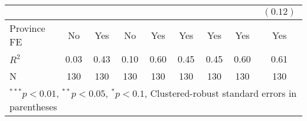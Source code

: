 \begin{tabular}{l c c c c c c c c }
                &              &          &               &               &          &          &              & $(0.12)$      \\
\hline
Province FE & No & Yes & No & Yes & Yes & Yes & Yes & Yes  \\ 
\hline
$R^2$           & 0.03         & 0.43     & 0.10          & 0.60          & 0.45     & 0.45     & 0.60         & 0.61          \\
N               & 130          & 130      & 130           & 130           & 130      & 130      & 130          & 130           \\
\hline
\multicolumn{9}{l}{\scriptsize{$^{***}p<0.01$, $^{**}p<0.05$, $^*p<0.1$, Clustered-robust standard errors in parentheses}}
\end{tabular}
